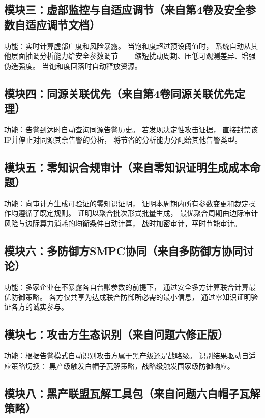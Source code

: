 \documentclass[11pt,a4paper]{article}
\begin{document}
\subsection{模块三：虚部监控与自适应调节（来自第4卷及安全参数自适应调节文档）}

功能：实时计算虚部广度和风险暴露。
当饱和度超过预设阈值时，
系统自动从其他层面抽调分析能力给安全参数调节——
缩短扰动周期、压低可观测差异、增强伪造强度。
当饱和度回落时自动释放资源。

\subsection{模块四：同源关联优先（来自第4卷同源关联优先定理）}

功能：告警到达时自动查询同源告警历史。
若发现决定性攻击证据，
直接封禁该IP并停止对同源其余告警的分析，
将节省的分析能力分配给其他告警类型。

\subsection{模块五：零知识合规审计（来自零知识证明生成成本命题）}

功能：向审计方生成可验证的零知识证明，
证明本周期内所有参数变更和裁定操作均遵循了既定规则。
证明以聚合批次形式批量生成，
最优聚合周期由边际审计风险与边际算力消耗的均衡条件自动计算，
战时加密审计，平时节能审计。

\subsection{模块六：多防御方SMPC协同（来自多防御方协同讨论）}

功能：多家企业在不暴露各自台账参数的前提下，
通过安全多方计算联合计算最优防御策略。
各方仅共享为达成联合防御所必需的最小信息，
通过零知识证明验证各方的诚实参与。

\subsection{模块七：攻击方生态识别（来自问题六修正版）}

功能：根据告警模式自动识别攻击方属于黑产级还是战略级。
识别结果驱动自适应策略切换：
黑产级触发白帽子瓦解策略，战略级触发国家级防御响应。

\subsection{模块八：黑产联盟瓦解工具包（来自问题六白帽子瓦解策略）}
\end{document}
